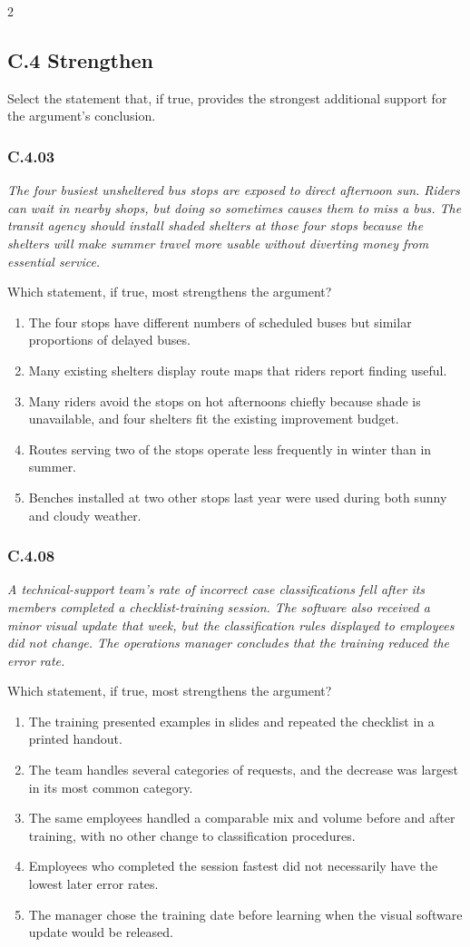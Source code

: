 \documentclass[10pt]{extarticle}
\newcommand{\choice}[1]{\item #1}
\newcommand{\bankitem}[1]{\subsubsection*{#1}}
\begin{document}
\begin{multicols}{2}
\subsection*{C.4 Strengthen}
Select the statement that, if true, provides the strongest additional support for the argument's conclusion.
\begin{samepage}
\bankitem{C.4.03}
\emph{The four busiest unsheltered bus stops are exposed to direct afternoon sun. Riders can wait in nearby shops, but doing so sometimes causes them to miss a bus. The transit agency should install shaded shelters at those four stops because the shelters will make summer travel more usable without diverting money from essential service.}

Which statement, if true, most strengthens the argument?
\begin{enumerate}[label=(\alph*)]
  \choice{The four stops have different numbers of scheduled buses but similar proportions of delayed buses.}
  \choice{Many existing shelters display route maps that riders report finding useful.}
  \choice{Many riders avoid the stops on hot afternoons chiefly because shade is unavailable, and four shelters fit the existing improvement budget.}
  \choice{Routes serving two of the stops operate less frequently in winter than in summer.}
  \choice{Benches installed at two other stops last year were used during both sunny and cloudy weather.}
\end{enumerate}
\end{samepage}\par\smallskip
\begin{samepage}
\bankitem{C.4.08}
\emph{A technical-support team's rate of incorrect case classifications fell after its members completed a checklist-training session. The software also received a minor visual update that week, but the classification rules displayed to employees did not change. The operations manager concludes that the training reduced the error rate.}

Which statement, if true, most strengthens the argument?
\begin{enumerate}[label=(\alph*)]
  \choice{The training presented examples in slides and repeated the checklist in a printed handout.}
  \choice{The team handles several categories of requests, and the decrease was largest in its most common category.}
  \choice{The same employees handled a comparable mix and volume before and after training, with no other change to classification procedures.}
  \choice{Employees who completed the session fastest did not necessarily have the lowest later error rates.}
  \choice{The manager chose the training date before learning when the visual software update would be released.}
\end{enumerate}
\end{samepage}\par\smallskip

\end{multicols}
\end{document}

